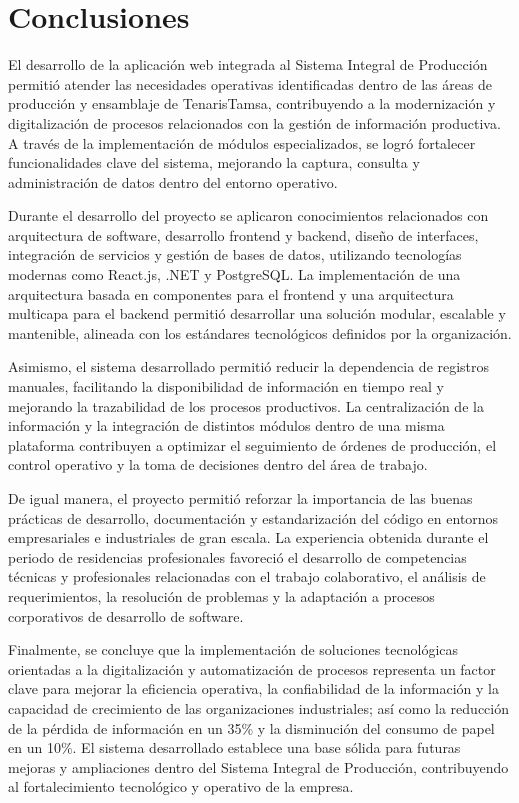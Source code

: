 \chapter*{Conclusiones}

El desarrollo de la aplicación web integrada al Sistema Integral de Producción permitió atender las necesidades operativas identificadas dentro de las áreas de producción y ensamblaje de TenarisTamsa, contribuyendo a la modernización y digitalización de procesos relacionados con la gestión de información productiva. A través de la implementación de módulos especializados, se logró fortalecer funcionalidades clave del sistema, mejorando la captura, consulta y administración de datos dentro del entorno operativo.

Durante el desarrollo del proyecto se aplicaron conocimientos relacionados con arquitectura de software, desarrollo frontend y backend, diseño de interfaces, integración de servicios y gestión de bases de datos, utilizando tecnologías modernas como React.js, .NET y PostgreSQL. La implementación de una arquitectura basada en componentes para el frontend y una arquitectura multicapa para el backend permitió desarrollar una solución modular, escalable y mantenible, alineada con los estándares tecnológicos definidos por la organización.

Asimismo, el sistema desarrollado permitió reducir la dependencia de registros manuales, facilitando la disponibilidad de información en tiempo real y mejorando la trazabilidad de los procesos productivos. La centralización de la información y la integración de distintos módulos dentro de una misma plataforma contribuyen a optimizar el seguimiento de órdenes de producción, el control operativo y la toma de decisiones dentro del área de trabajo.

De igual manera, el proyecto permitió reforzar la importancia de las buenas prácticas de desarrollo, documentación y estandarización del código en entornos empresariales e industriales de gran escala. La experiencia obtenida durante el periodo de residencias profesionales favoreció el desarrollo de competencias técnicas y profesionales relacionadas con el trabajo colaborativo, el análisis de requerimientos, la resolución de problemas y la adaptación a procesos corporativos de desarrollo de software.

Finalmente, se concluye que la implementación de soluciones tecnológicas orientadas a la digitalización y automatización de procesos representa un factor clave para mejorar la eficiencia operativa, la confiabilidad de la información y la capacidad de crecimiento de las organizaciones industriales; así como la reducción de la pérdida de información en un 35\% y la disminución del consumo de papel en un 10\%. El sistema desarrollado establece una base sólida para futuras mejoras y ampliaciones dentro del Sistema Integral de Producción, contribuyendo al fortalecimiento tecnológico y operativo de la empresa.